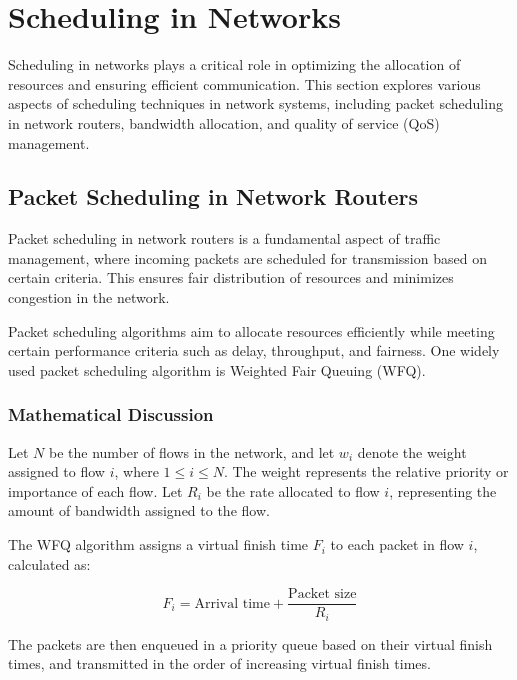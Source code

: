 \documentclass[12pt]{book} %
\begin{document}
\section{Scheduling in Networks}

Scheduling in networks plays a critical role in optimizing the allocation of resources and ensuring efficient communication. This section explores various aspects of scheduling techniques in network systems, including packet scheduling in network routers, bandwidth allocation, and quality of service (QoS) management.

\subsection{Packet Scheduling in Network Routers}

Packet scheduling in network routers is a fundamental aspect of traffic management, where incoming packets are scheduled for transmission based on certain criteria. This ensures fair distribution of resources and minimizes congestion in the network.

Packet scheduling algorithms aim to allocate resources efficiently while meeting certain performance criteria such as delay, throughput, and fairness. One widely used packet scheduling algorithm is Weighted Fair Queuing (WFQ).

\subsubsection{Mathematical Discussion}

Let $N$ be the number of flows in the network, and let $w_i$ denote the weight assigned to flow $i$, where $1 \leq i \leq N$. The weight represents the relative priority or importance of each flow. Let $R_i$ be the rate allocated to flow $i$, representing the amount of bandwidth assigned to the flow.

The WFQ algorithm assigns a virtual finish time $F_i$ to each packet in flow $i$, calculated as:

\begin{equation*}
    F_i = \text{Arrival time} + \frac{\text{Packet size}}{R_i}
\end{equation*}

The packets are then enqueued in a priority queue based on their virtual finish times, and transmitted in the order of increasing virtual finish times.
\end{document}
